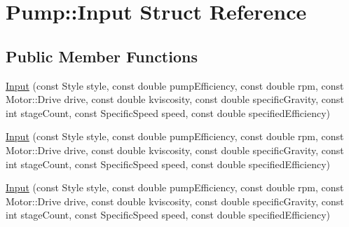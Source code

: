 \hypertarget{struct_pump_1_1_input}{}\section{Pump\+:\+:Input Struct Reference}
\label{struct_pump_1_1_input}
\subsection*{Public Member Functions}
\begin{DoxyCompactItemize}
\item 
\hyperlink{struct_pump_1_1_input_a71e2e30fbb9355f39f63f171ac5fac9e}{Input} (const Style style, const double pump\+Efficiency, const double rpm, const Motor\+::\+Drive drive, const double kviscosity, const double specific\+Gravity, const int stage\+Count, const Specific\+Speed speed, const double specified\+Efficiency)
\item 
\hyperlink{struct_pump_1_1_input_a71e2e30fbb9355f39f63f171ac5fac9e}{Input} (const Style style, const double pump\+Efficiency, const double rpm, const Motor\+::\+Drive drive, const double kviscosity, const double specific\+Gravity, const int stage\+Count, const Specific\+Speed speed, const double specified\+Efficiency)
\item 
\hyperlink{struct_pump_1_1_input_a71e2e30fbb9355f39f63f171ac5fac9e}{Input} (const Style style, const double pump\+Efficiency, const double rpm, const Motor\+::\+Drive drive, const double kviscosity, const double specific\+Gravity, const int stage\+Count, const Specific\+Speed speed, const double specified\+Efficiency)
\end{DoxyCompactItemize}

